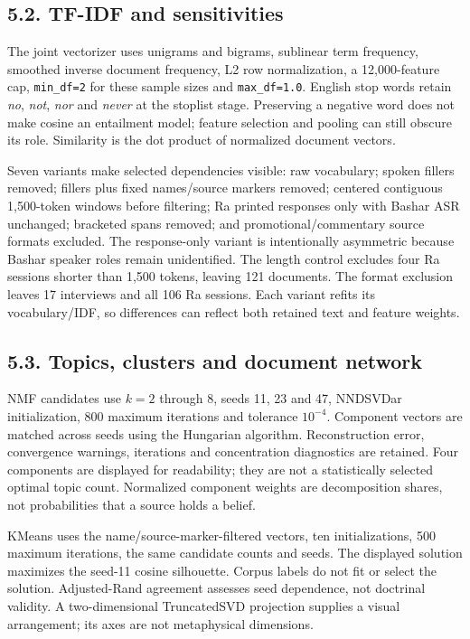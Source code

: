 \documentclass[
  11pt,
]{article}
\begin{document}
\FloatBarrier

\subsection{5.2. TF-IDF and
sensitivities}\label{tf-idf-and-sensitivities}

The joint vectorizer uses unigrams and bigrams, sublinear term
frequency, smoothed inverse document frequency, L2 row normalization, a
12,000-feature cap, \texttt{min\_df=2} for these sample sizes and
\texttt{max\_df=1.0}. English stop words retain \emph{no}, \emph{not},
\emph{nor} and \emph{never} at the stoplist stage. Preserving a negative
word does not make cosine an entailment model; feature selection and
pooling can still obscure its role. Similarity is the dot product of
normalized document vectors.

Seven variants make selected dependencies visible: raw vocabulary;
spoken fillers removed; fillers plus fixed names/source markers removed;
centered contiguous 1,500-token windows before filtering; Ra printed
responses only with Bashar ASR unchanged; bracketed spans removed; and
promotional/commentary source formats excluded. The response-only
variant is intentionally asymmetric because Bashar speaker roles remain
unidentified. The length control excludes four Ra sessions shorter than
1,500 tokens, leaving 121 documents. The format exclusion leaves 17
interviews and all 106 Ra sessions. Each variant refits its
vocabulary/IDF, so differences can reflect both retained text and
feature weights.

\FloatBarrier

\subsection{5.3. Topics, clusters and document
network}\label{topics-clusters-and-document-network}

NMF candidates use \(k=2\) through \(8\), seeds 11, 23 and 47, NNDSVDar
initialization, 800 maximum iterations and tolerance \(10^{-4}\).
Component vectors are matched across seeds using the Hungarian
algorithm. Reconstruction error, convergence warnings, iterations and
concentration diagnostics are retained. Four components are displayed
for readability; they are not a statistically selected optimal topic
count. Normalized component weights are decomposition shares, not
probabilities that a source holds a belief.

KMeans uses the name/source-marker-filtered vectors, ten
initializations, 500 maximum iterations, the same candidate counts and
seeds. The displayed solution maximizes the seed-11 cosine silhouette.
Corpus labels do not fit or select the solution. Adjusted-Rand agreement
assesses seed dependence, not doctrinal validity. A two-dimensional
TruncatedSVD projection supplies a visual arrangement; its axes are not
metaphysical dimensions.
\end{document}
